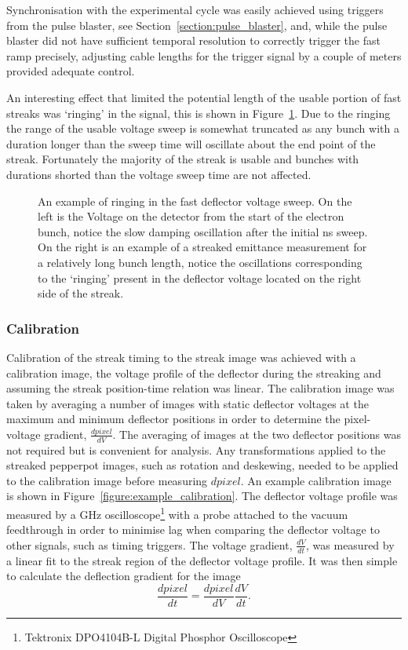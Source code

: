 Synchronisation with the experimental cycle was easily achieved using triggers from the pulse blaster, see Section~\ref{section:pulse_blaster}, and, while the pulse blaster did not have sufficient temporal resolution to correctly trigger the fast ramp precisely, adjusting cable lengths for the trigger signal by a couple of meters provided adequate control.

An interesting effect that limited the potential length of the usable portion of fast streaks was `ringing' in the signal, this is shown in Figure~\ref{figure:ringing}.
Due to the ringing the range of the usable voltage sweep is somewhat truncated as any bunch with a duration longer than the sweep time will oscillate about the end point of the streak.
Fortunately the majority of the streak is usable and bunches with durations shorted than the voltage sweep time are not affected.

\begin{figure}
    \center
    
    \caption[Streak deflector voltage oscillations.]{An example of ringing in the fast deflector voltage sweep. On the left is the Voltage on the detector from the start of the electron bunch, notice the slow damping oscillation after the initial \unit[10]{ns} sweep. On the right is an example of a streaked emittance measurement for a relatively long bunch length, notice the oscillations corresponding to the `ringing' present in the deflector voltage located on the right side of the streak.}
    \label{figure:ringing}
\end{figure}

\subsubsection{Calibration}
Calibration of the streak timing to the streak image was achieved with a calibration image, the voltage profile of the deflector during the streaking and assuming the streak position-time relation was linear.
The calibration image was taken by averaging a number of images with static deflector voltages at the maximum and minimum deflector positions in order to determine the pixel-voltage gradient, $\frac{dpixel}{dV}$.
The averaging of images at the two deflector positions was not required but is convenient for analysis.
Any transformations applied to the streaked pepperpot images, such as rotation and deskewing, needed to be applied to the calibration image before measuring $dpixel$.
An example calibration image is shown in Figure~\ref{figure:example_calibration}.
The deflector voltage profile was measured by a \unit[1]{GHz} oscilloscope\footnote{Tektronix DPO4104B-L Digital Phosphor Oscilloscope} with a probe attached to the vacuum feedthrough in order to minimise lag when comparing the deflector voltage to other signals, such as timing triggers.
The voltage gradient, $\frac{dV}{dt}$, was measured by a linear fit to the streak region of the deflector voltage profile.
It was then simple to calculate the  deflection gradient for the image
\begin{equation}
\frac{dpixel}{dt} = \frac{dpixel}{dV} \frac{dV}{dt}.
\end{equation}

